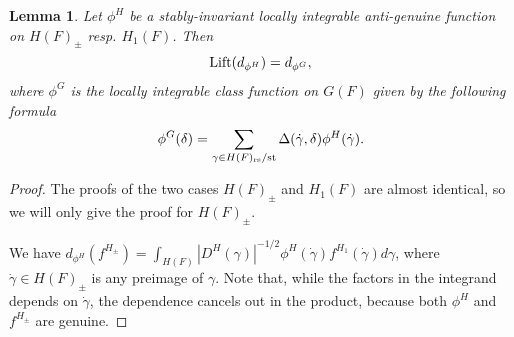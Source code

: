\documentclass{article}
\newtheorem{lem}[thm]{Lemma}
\theoremstyle{definition}
\numberwithin{equation}{section}
\renewcommand{\-}{\hyp{}}
\begin{document}
\begin{lem} \label{lem:equi}
	Let $\phi^H$ be a stably-invariant locally integrable anti-genuine function on $H(F)_\pm$ resp. $H_1(F)$. Then 
	\[ \textrm{Lift}(d_{\phi^H}) = d_{\phi^G}, \]
	where $\phi^G$ is the locally integrable class function on $G(F)$ given by the following formula
	\[ \phi^G(\delta) = \sum_{\gamma \in H(F)_{\textrm{rs}}/\textrm{st} } \Delta(\dot\gamma,\delta) \phi^H(\dot\gamma). \]
	\end{lem}
	\begin{proof}
	The proofs of the two cases $H(F)_\pm$ and $H_1(F)$ are almost identical, so we will only give the proof for $H(F)_\pm$.
	
	We have $d_{\phi^H}(f^{H_\pm}) = \int_{H(F)}|D^H(\gamma)|^{-1/2}\phi^H(\dot\gamma)f^{H_1}(\dot\gamma)d\gamma$, where $\dot\gamma \in H(F)_\pm$ is any preimage of $\gamma$. Note that, while the factors in the integrand depends on $\dot\gamma$, the dependence cancels out in the product, because both $\phi^H$ and $f^{H_\pm}$ are genuine.
	

\end{proof}
\end{document}
